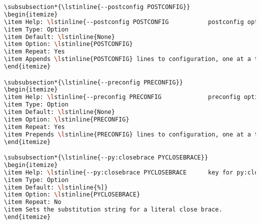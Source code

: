 \begin{snugshade}
\begin{lstlisting}[language=bash]
\subsubsection*{\lstinline{--postconfig POSTCONFIG}}
\begin{itemize}
\item Help: \lstinline{--postconfig POSTCONFIG           postconfig option}
\item Type: Option
\item Default: \lstinline{None}
\item Option: \lstinline{POSTCONFIG}
\item Repeat: Yes
\item Appends \lstinline{POSTCONFIG} lines to configuration, one at a time. Can be used to alter configuration for a single command execution.
\end{itemize}

\subsubsection*{\lstinline{--preconfig PRECONFIG}}
\begin{itemize}
\item Help: \lstinline{--preconfig PRECONFIG             preconfig option}
\item Type: Option
\item Default: \lstinline{None}
\item Option: \lstinline{PRECONFIG}
\item Repeat: Yes
\item Prepends \lstinline{PRECONFIG} lines to configuration, one at a time. Can be used to alter configuration for a single command execution.
\end{itemize}

\subsubsection*{\lstinline{--py:closebrace PYCLOSEBRACE}}
\begin{itemize}
\item Help: \lstinline{--py:closebrace PYCLOSEBRACE      key for py:closebrace}
\item Type: Option
\item Default: \lstinline{%]}
\item Option: \lstinline{PYCLOSEBRACE}
\item Repeat: No
\item Sets the substitution string for a literal close brace.
\end{itemize}


\end{lstlisting}
\end{snugshade}
